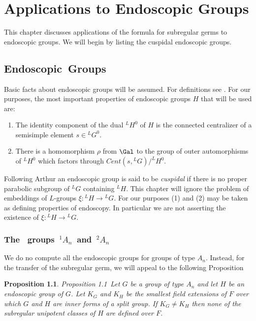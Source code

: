 \documentclass{memo-l}
\newtheorem{proposition}[theorem]{Proposition}
\theoremstyle{definition}
\theoremstyle{remark}
\numberwithin{section}{chapter}
\numberwithin{equation}{chapter}
\begin{document}

\chapter{Applications to Endoscopic Groups}





   This chapter discusses applications of the formula for subregular germs
to endoscopic groups.  We will begin by listing the cuspidal endoscopic
groups.

\section{Endoscopic\ Groups}

  Basic facts about endoscopic groups will be assumed.  For definitions see
\cite{MR697567}.  For our purposes, the most important properties of endoscopic
groups $H$ that will be used are:
\begin{enumerate}[label=\arabic*)]
\item The identity component of the dual $^{L}H^{0}$ of $H$ is the connected
centralizer of a semisimple element $s  \in  {}^{L}G^{0}$.
\item There is a homomorphism ${\rho }$ from $\Gal$ to the group
of outer automorphisms of $^{L}H^{0}$ which factors through
$Cent(s,{}^{L}G)/^{L}H^{0}$.
\end{enumerate}

\medpagebreak

   Following Arthur an endoscopic group is said to be {\it  cuspidal} if
there is no proper parabolic subgroup of ${}^{L}G$ containing ${}^{L}H$.
This chapter will ignore the problem of embeddings of $L$-groups $\xi:{}^LH
\to {}^LG$.   For our purposes (1) and (2) may be taken as defining properties
of endoscopy.  In particular we are not asserting the existence of $\xi:{}^LH\to
{}^LG$.

\subsection{The \ groups\  ${}^{1}A_{n}$\ and\ ${}^{2}A_n$}

   We do no compute all the endoscopic groups for groups of type $A_{n}$.
Instead, for the transfer of the subregular germ, we will appeal to the
following Proposition

\begin{proposition}{Proposition 1.1}\ Let $G$ be a group of type $A_{n}$ and let
$H$ be an endoscopic group of $G$.  Let $K_{G}$ and $K_{H}$ be the smallest
field extensions of $F$ over which $G$ and $H$ are inner forms of a split
group.  If $K_{G} \ne K_{H}$ then none of the subregular unipotent classes
of $H$ are defined over $F$.
\end{proposition}
\end{document}
